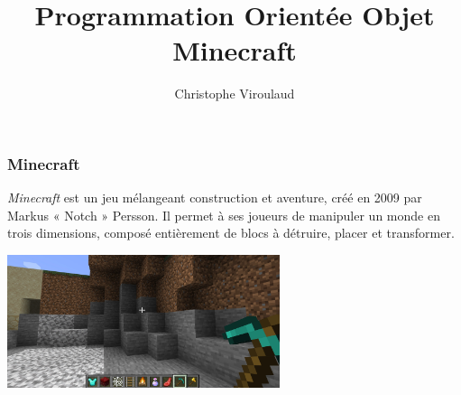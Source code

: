 \documentclass[svgnames,11pt]{beamer}
\author[]{Christophe Viroulaud}
\title{Programmation Orientée Objet\\Minecraft}
\date{}
\institute{Terminale - NSI}
\begin{document}
\begin{frame}
    \titlepage
\end{frame}
\begin{frame}
    \frametitle{Minecraft}

    \emph{Minecraft} est un jeu mélangeant construction et aventure, créé en 2009 par Markus « Notch » Persson. Il permet à ses joueurs de manipuler un monde en trois dimensions, composé entièrement de blocs à détruire, placer et transformer.
    \begin{center}
        \centering
        \includegraphics[width=8cm]{ressources/minecraft.jpg}
    \end{center}


\end{frame}
\begin{frame}
    \frametitle{}

    \begin{center}
    \end{center}

\end{frame}
\end{document}
